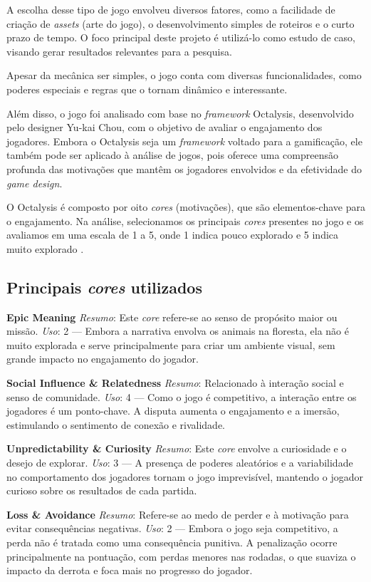 A escolha desse tipo de jogo envolveu diversos fatores, como a facilidade de criação de \textit{assets} (arte do jogo), o desenvolvimento simples de roteiros e o curto prazo de tempo. O foco principal deste projeto é utilizá-lo como estudo de caso, visando gerar resultados relevantes para a pesquisa.

Apesar da mecânica ser simples, o jogo conta com diversas funcionalidades, como poderes especiais e regras que o tornam dinâmico e interessante.

Além disso, o jogo foi analisado com base no \textit{framework} Octalysis, desenvolvido pelo designer Yu-kai Chou, com o objetivo de avaliar o engajamento dos jogadores. Embora o Octalysis seja um \textit{framework} voltado para a gamificação, ele também pode ser aplicado à análise de jogos, pois oferece uma compreensão profunda das motivações que mantêm os jogadores envolvidos e da efetividade do \textit{game design}.

O Octalysis é composto por oito \textit{cores} (motivações), que são elementos-chave para o engajamento. Na análise, selecionamos os principais \textit{cores} presentes no jogo e os avaliamos em uma escala de 1 a 5, onde 1 indica pouco explorado e 5 indica muito explorado \cite{octalysis}.

\subsection*{Principais \textit{cores} utilizados}

\textbf{Epic Meaning}
\textit{Resumo}: Este \textit{core} refere-se ao senso de propósito maior ou missão.
\textit{Uso}: 2 — Embora a narrativa envolva os animais na floresta, ela não é muito explorada e serve principalmente para criar um ambiente visual, sem grande impacto no engajamento do jogador.

\vspace{0.5em}
\textbf{Social Influence \& Relatedness}
\textit{Resumo}: Relacionado à interação social e senso de comunidade.
\textit{Uso}: 4 — Como o jogo é competitivo, a interação entre os jogadores é um ponto-chave. A disputa aumenta o engajamento e a imersão, estimulando o sentimento de conexão e rivalidade.

\vspace{0.5em}
\textbf{Unpredictability \& Curiosity}
\textit{Resumo}: Este \textit{core} envolve a curiosidade e o desejo de explorar.
\textit{Uso}: 3 — A presença de poderes aleatórios e a variabilidade no comportamento dos jogadores tornam o jogo imprevisível, mantendo o jogador curioso sobre os resultados de cada partida.

\vspace{0.5em}
\textbf{Loss \& Avoidance}
\textit{Resumo}: Refere-se ao medo de perder e à motivação para evitar consequências negativas.
\textit{Uso}: 2 — Embora o jogo seja competitivo, a perda não é tratada como uma consequência punitiva. A penalização ocorre principalmente na pontuação, com perdas menores nas rodadas, o que suaviza o impacto da derrota e foca mais no progresso do jogador.
